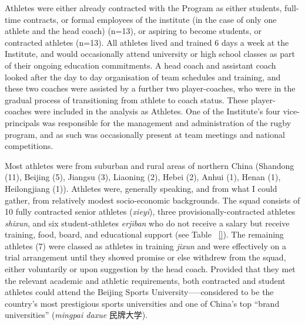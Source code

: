 

Athletes were either already contracted with the Program as either students, full-time contracts, or formal employees of the institute (in the case of only one athlete and the head coach) (n=13), or aspiring to become students, or contracted athletes (n=13).  All athletes lived and trained 6 days a week at the Institute, and would occasionally attend university or high school classes as part of their ongoing education commitments.  A head coach and assistant coach looked after the day to day organisation of team schedules and training, and these two coaches were assisted by a further two player-coaches, who were in the gradual process of transitioning from athlete to coach status.  These player-coaches were included in the analysis as Athletes.  One of the Institute's four vice-principals was responsible for the management and administration of the rugby program, and as such was occasionally present at team meetings and national competitions.

Most athletes were from suburban and rural areas of northern China (Shandong (11), Beijing (5), Jiangsu (3), Liaoning (2), Hebei (2), Anhui (1), Henan (1), Heilongjiang (1)).  Athletes were, generally speaking, and from what I could gather, from relatively modest socio-economic backgrounds. The squad consists of 10 fully contracted senior athletes (\textit{xieyi}), three provisionally-contracted athletes \textit{shixun}, and six student-athletes \textit{erjiban} who do not receive a salary but receive training, food, board, and educational support (see Table ~\ref{}).  The remaining athletes (7) were classed as athletes in training \textit{jixun} and were effectively on a trial arrangement until they showed promise or else withdrew from the squad, either voluntarily or upon suggestion by the head coach.  Provided that they met the relevant academic and athletic requirements, both contracted and student athletes could attend the Beijing Sports University—--considered to be the country's most prestigious sports universities and one of China's top ``brand universities'' (\textit{mingpai daxue} 民牌大学).

